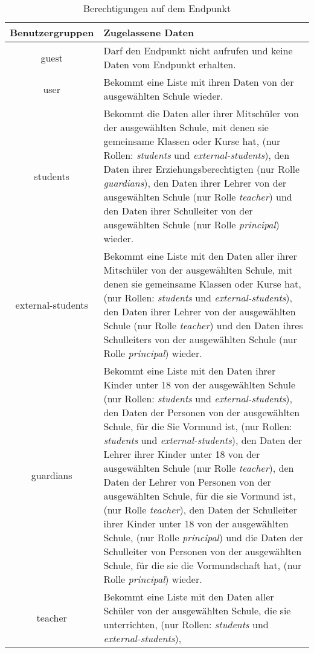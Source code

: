 \begin{longtable}{|c|p{}|}
\caption{Berechtigungen auf dem Endpunkt}
\endfoot
		\caption{Berechtigungen auf dem Endpunkt}
		\label{tab:rest:api:schools:id:users:read:right}
\endlastfoot
\hline
\textbf{Benutzergruppen} & \textbf{Zugelassene Daten} \\ \hline
\endhead
guest & Darf den Endpunkt nicht aufrufen und keine Daten vom Endpunkt erhalten. \\ \hline
user & Bekommt eine Liste mit ihren Daten von der ausgewählten Schule wieder. \\ \hline 
students & Bekommt die Daten aller ihrer Mitschüler von der ausgewählten Schule, mit denen sie gemeinsame Klassen oder Kurse hat, (nur Rollen: \textit{students} und \textit{external-students}),
           den Daten ihrer Erziehungsberechtigten (nur Rolle \textit{guardians}), 
					 den Daten ihrer Lehrer von der ausgewählten Schule (nur Rolle \textit{teacher}) und 
					 den Daten ihrer Schulleiter von der ausgewählten Schule (nur Rolle \textit{principal}) wieder.\\ \hline
external-students &  Bekommt eine Liste mit den Daten aller ihrer Mitschüler von der ausgewählten Schule, mit denen sie gemeinsame Klassen oder Kurse hat,  (nur Rollen: \textit{students} und \textit{external-students}),
           den Daten ihrer Lehrer von der ausgewählten Schule (nur Rolle \textit{teacher}) und 
					 den Daten ihres Schulleiters von der ausgewählten Schule (nur Rolle \textit{principal}) wieder.\\ \hline
guardians & Bekommt eine Liste mit den Daten ihrer Kinder unter 18 von der ausgewählten Schule (nur Rollen: \textit{students} und \textit{external-students}), 
					den Daten der Personen von der ausgewählten Schule, für die Sie Vormund ist, (nur Rollen: \textit{students} und \textit{external-students}), 
					den Daten der Lehrer ihrer Kinder unter 18 von der ausgewählten Schule (nur Rolle \textit{teacher}),
					den Daten der Lehrer von Personen von der ausgewählten Schule, für die sie Vormund ist, (nur Rolle \textit{teacher}),
					den Daten der Schulleiter ihrer Kinder unter 18 von der ausgewählten Schule, (nur Rolle \textit{principal}) und
					die Daten der Schulleiter von Personen von der ausgewählten Schule, für die sie die Vormundschaft hat, (nur Rolle \textit{principal})
					wieder.\\ \hline
teacher & Bekommt eine Liste mit den Daten aller Schüler von der ausgewählten Schule, die sie unterrichten, (nur Rollen: \textit{students} und \textit{external-students}),

\end{longtable}
